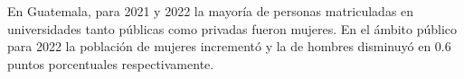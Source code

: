 En Guatemala, para 2021 y 2022 la mayoría de personas matriculadas en universidades tanto públicas como privadas fueron mujeres. En el ámbito público para 2022 la población de mujeres incrementó y la de hombres disminuyó en 0.6 puntos porcentuales respectivamente. 